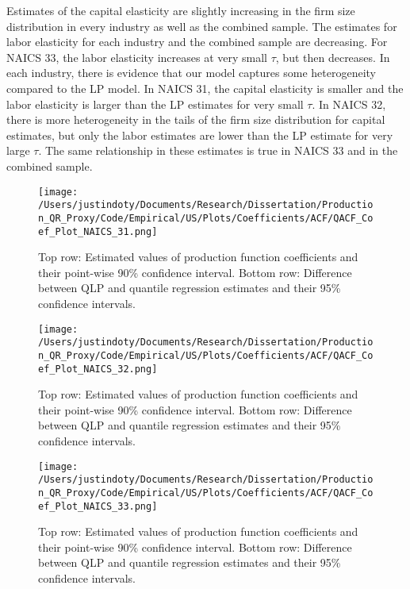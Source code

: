 \documentclass[11pt]{article}
\begin{document}
Estimates of the capital elasticity are slightly increasing in the firm size distribution in every industry as well as the combined sample. The estimates for labor elasticity for each industry and the combined sample are decreasing. For NAICS 33, the labor elasticity increases at very small $\tau$, but then decreases. In each industry, there is evidence that our model captures some heterogeneity compared to the LP model. In NAICS 31, the capital elasticity is smaller and the labor elasticity is larger than the LP estimates for very small $\tau$. In NAICS 32, there is more heterogeneity in the tails of the firm size distribution for capital estimates, but only the labor estimates are lower than the LP estimate for very large $\tau$. The same relationship in these estimates is true in NAICS 33 and in the combined sample.

\begin{figure}[H]
\centering
\texttt{[image: /Users/justindoty/Documents/Research/Dissertation/Production\_QR\_Proxy/Code/Empirical/US/Plots/Coefficients/ACF/QACF\_Coef\_Plot\_NAICS\_31.png]}
\caption{Top row: Estimated values of production function coefficients and their point-wise 90\% confidence interval. Bottom row: Difference between QLP and quantile regression estimates and their 95\% confidence intervals.}
\label{fig:31coef}
\end{figure}

\begin{figure}[H]
\centering
\texttt{[image: /Users/justindoty/Documents/Research/Dissertation/Production\_QR\_Proxy/Code/Empirical/US/Plots/Coefficients/ACF/QACF\_Coef\_Plot\_NAICS\_32.png]}
\caption{Top row: Estimated values of production function coefficients and their point-wise 90\% confidence interval. Bottom row: Difference between QLP and quantile regression estimates and their 95\% confidence intervals.}
\label{fig:32coef}
\end{figure}

\begin{figure}[H]
\centering
\texttt{[image: /Users/justindoty/Documents/Research/Dissertation/Production\_QR\_Proxy/Code/Empirical/US/Plots/Coefficients/ACF/QACF\_Coef\_Plot\_NAICS\_33.png]}
\caption{Top row: Estimated values of production function coefficients and their point-wise 90\% confidence interval. Bottom row: Difference between QLP and quantile regression estimates and their 95\% confidence intervals.}
\label{fig:33coef}
\end{figure}
\end{document}
